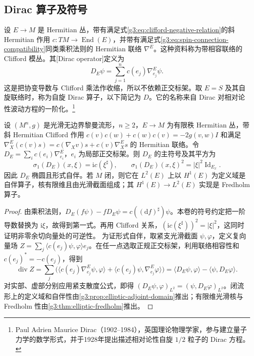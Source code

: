 \subsection{Dirac 算子及符号}
\label{g3:subsec:1703:03}
设 \(E\to M\) 是 Hermitian 丛，带有满足式\eqref{g3:eq:clifford-negative-relation}的斜 Hermitian 作用 \(c:TM\to\operatorname{End}(E)\)，并带有满足式\eqref{g3:eq:spin-connection-compatibility}同类乘积法则的 Hermitian 联络 \(\nabla^E\)。这种资料称为带相容联络的 Clifford 模丛。其[Dirac operator]定义为
\begin{equation}\label{g3:eq:clifford-dirac-definition}
	D_E\psi=\sum_{j=1}^n c(e_j)\nabla^E_{e_j}\psi.
\end{equation}
这是把协变导数与 Clifford 乘法作收缩，所以不依赖正交标架。取 \(E=S\) 及其自旋联络时，称为自旋 Dirac 算子，以下简记为 \(D\)。它的名称来自 Dirac 对相对论性波动方程的一阶化。\footnote{Paul Adrien Maurice Dirac（1902--1984），英国理论物理学家，参与建立量子力学的数学形式，并于1928年提出描述相对论性自旋 \(1/2\) 粒子的 Dirac 方程。}

\begin{theorem}\label{g3:thm:spin-dirac-elliptic}
	设 \((M^n,g)\) 是光滑无边界黎曼流形，\(n\ge2\)，\(E\to M\) 为有限秩 Hermitian 丛，带斜 Hermitian Clifford 作用 \(c(v)c(w)+c(w)c(v)=-2g(v,w)I\) 和满足 \(\nabla^E_X(c(v)s)=c(\nabla_Xv)s+c(v)\nabla^E_Xs\) 的 Hermitian 联络。令 \(D_E=\sum_i c(e_i)\nabla^E_{e_i}\)，\(e_i\) 为局部正交标架。则 \(D_E\) 的主符号及其平方为
	\begin{equation}\label{g3:eq:dirac-principal-symbol}
		\sigma_1(D_E)(x,\xi)=\mathrm i c(\xi^\sharp),
		\qquad \sigma_1(D_E)(x,\xi)^2=|\xi|^2\operatorname{Id}_{E_x}.
	\end{equation}
	因此 \(D_E\) 椭圆且形式自伴。若 \(M\) 闭，则它在 \(L^2(E)\) 上以 \(H^1(E)\) 为定义域是自伴算子，核有限维且由光滑截面组成；其 \(H^1(E)\to L^2(E)\) 实现是 Fredholm 算子。
\end{theorem}
\begin{proof}
	由乘积法则，\(D_E(f\psi)-fD_E\psi=c((\mathrm df)^\sharp)\psi\)。本卷的符号约定把一阶导数替换为 \(\mathrm i\xi\)，故得到第一式。再用 Clifford 关系，\((\mathrm i c(\xi^\sharp))^2=|\xi|^2\)，这同时证明非零余切向量处的可逆性。
	为证形式自伴，取紧支光滑截面 \(\psi,\varphi\)，定义复向量场
	\(Z=\sum_j\langle c(e_j)\psi,\varphi\rangle e_j\)。在任一点选取正规正交标架，利用联络相容性和 \(c(e_j)^*=-c(e_j)\)，得到
	\[
		\operatorname{div}Z
		=\sum_j\bigl(\langle c(e_j)\nabla^E_{e_j}\psi,\varphi\rangle
		+\langle c(e_j)\psi,\nabla^E_{e_j}\varphi\rangle\bigr)
		=\langle D_E\psi,\varphi\rangle-\langle\psi,D_E\varphi\rangle.
	\]
	对实部、虚部分别应用紧支散度公式，即得 \((D_E\psi,\varphi)_{L^2}=(\psi,D_E\varphi)_{L^2}\)。闭流形上的定义域和自伴性由\cref{g3:prop:elliptic-adjoint-domain}推出；有限维光滑核与 Fredholm 性由\cref{g3:thm:elliptic-fredholm}推出。
\end{proof}


